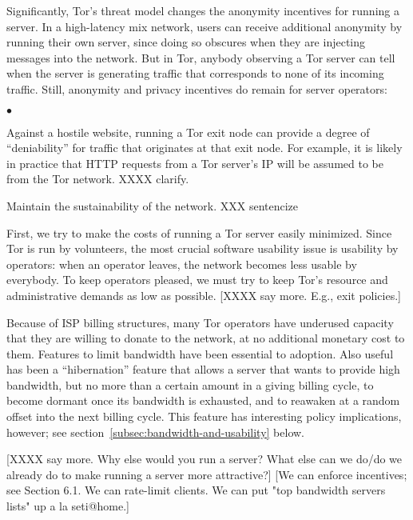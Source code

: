 \documentclass{llncs}
\newenvironment{tightlist}{\begin{list}{$\bullet$}{
  \setlength{\itemsep}{0mm}
    \setlength{\parsep}{0mm}
    }}{\end{list}}
\begin{document}
Significantly, Tor's threat model changes the anonymity incentives for running
a server.  In a high-latency mix network, users can receive additional
anonymity by running their own server, since doing so obscures when they are
injecting messages into the network.  But in Tor, anybody observing a Tor
server can tell when the server is generating traffic that corresponds to
none of its incoming traffic.
Still, anonymity and privacy incentives do remain for server operators:
\begin{tightlist}
\item Against a hostile website, running a Tor exit node can provide a degree
  of ``deniability'' for traffic that originates at that exit node.  For
  example, it is likely in practice that HTTP requests from a Tor server's IP
  will be assumed to be from the Tor network.
XXXX clarify.
\item Maintain the sustainability of the network. XXX sentencize
\end{tightlist}

First, we try to make the costs of running a Tor server easily minimized.
Since Tor is run by volunteers, the most crucial software usability issue is
usability by operators: when an operator leaves, the network becomes less
usable by everybody.  To keep operators pleased, we must try to keep Tor's
resource and administrative demands as low as possible. [XXXX say more. E.g.,
exit policies.]

Because of ISP billing structures, many Tor operators have underused capacity
that they are willing to donate to the network, at no additional monetary
cost to them.  Features to limit bandwidth have been essential to adoption.
Also useful has been a ``hibernation'' feature that allows a server that
wants to provide high bandwidth, but no more than a certain amount in a
giving billing cycle, to become dormant once its bandwidth is exhausted, and
to reawaken at a random offset into the next billing cycle.  This feature has
interesting policy implications, however; see
section~\ref{subsec:bandwidth-and-usability} below.

[XXXX say more.  Why else would you run a server? What else can we do/do we
  already do to make running a server more attractive?]
[We can enforce incentives; see Section 6.1. We can rate-limit clients.
  We can put "top bandwidth servers lists" up a la seti@home.]
\end{document}
